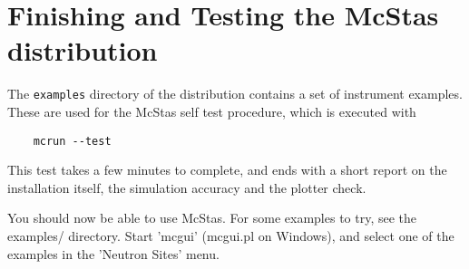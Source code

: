 \section{Finishing and Testing the McStas distribution}
\label{s:testing}

The \verb+examples+ directory of the distribution contains a set of instrument examples. These are used for the McStas self test procedure, which is executed with
\begin{verbatim}
    mcrun --test
\end{verbatim}
This test takes a few minutes to complete, and ends with a short report on the installation itself, the simulation accuracy and the plotter check. 

You should now be able to use McStas. For some examples to try, see the
examples/ directory. Start 'mcgui' (mcgui.pl on Windows), and select one of the examples in the 'Neutron Sites' menu.

